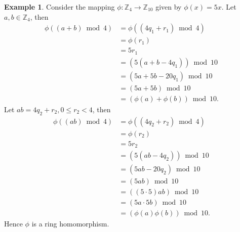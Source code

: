 \documentclass{article}
\theoremstyle{definition}
\newtheorem{example}{Example}[section]
\begin{document}
\begin{example}
    Consider the mapping $\phi:\mathbb{Z}_4\to\mathbb{Z}_{10}$ given by $\phi(x)=5x$. Let $a,b\in\mathbb{Z}_4$, then
    \begin{align*}
        \phi((a+b)\bmod4)&=\phi((4q_1+r_1)\bmod4)\\
        &=\phi(r_1)\\
        &=5r_1\\
        &=(5(a+b-4q_1))\bmod10\\
        &=(5a+5b-20q_1)\bmod10\\
        &=(5a+5b)\bmod10\\
        &=(\phi(a)+\phi(b))\bmod10.
    \end{align*}
    Let $ab=4q_2+r_2,0\leq r_2<4$, then
    \begin{align*}
        \phi((ab)\bmod4)&=\phi((4q_2+r_2)\bmod4)\\
        &=\phi(r_2)\\
        &=5r_2\\
        &=(5(ab-4q_2))\bmod10\\
        &=(5ab-20q_2)\bmod10\\
        &=(5ab)\bmod10\\
        &=((5\cdot5)ab)\bmod10\\
        &=(5a\cdot5b)\bmod10\\
        &=(\phi(a)\phi(b))\bmod10.
    \end{align*}
    Hence $\phi$ is a ring homomorphism.
\end{example}
\end{document}
